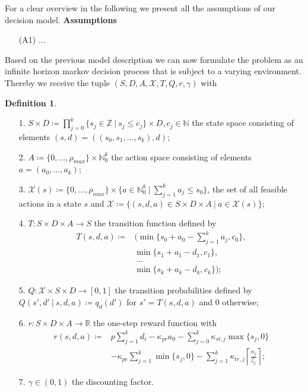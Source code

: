 \documentclass[journal, a4paper]{IEEEtran}
\theoremstyle{plain}
\theoremstyle{definition}
\newtheorem{defn}[thm]{Definition}
\begin{document}
%
For a clear overview in the following we present all the assumptions of our decision model.
\textbf{Assumptions}
\begin{itemize}
	\item[(A1)] ...
\end{itemize}
Based on the previous model description we can now formulate the problem as an infinite horizon markov decision process that is subject to a varying environment. Thereby we receive the tuple $(S, D, A, \mathcal{X}, T, Q, r, \gamma)$ with
\begin{defn} \label{def:modell} \
	\begin{itemize}
		\item[1.] $S \times D \coloneqq \prod\limits_{j=0}^{k} \{s_j \in \mathbb{Z} \ | \ s_j \leq c_j\} \times D, c_j \in \mathbb{N}$ the state space consisting of elements $(s,d) = ((s_0, s_1, ... , s_k), d)$;
		\item[2.] $ A \coloneqq  \{0, ..., \rho_{max} \} \times \mathbb{N}_0^k$ the action space consisting of elements $a = (a_0, ..., a_k)$;
		\item[3.] $ \mathcal{X} (s) \coloneqq \{0, ..., \rho_{max} \} \times \{a \in \mathbb{N}_0^k \ | \ \sum_{j=1}^{k}a_j \leq s_0  \}$, the set of all feasible actions in a state $s$ and $\mathcal{X} \coloneqq \{(s, d , a) \in S \times D \times A \ | \ a \in \mathcal{X} (s)\}$;
		\item[4.] $ T: S \times D \times A \rightarrow S$ the transition function defined by
			\begin{equation*}
				\begin{split}
					T(s, d, a) \coloneqq &(\min\{s_0 + a_0 - \sum_{j=1}^{k}a_j, c_0 \}, \\
					&\min\{s_1 + a_1 - d_1, c_1 \}, \\
					&\ ... \\
					&\min\{s_k + a_k - d_k, c_k \});
				\end{split}
			\end{equation*}
		\item[5.] $ Q: \mathcal{X} \times S \times D \rightarrow [0,1]  $ the transition probabilities defined by $Q(s', d'\ |\ s, d, a) \coloneqq q_d(d')$ for $s' = T(s, d, a)$ and $0$ otherwise;
		\item[6.] $ r: S \times D \times A \rightarrow \mathbb{R} $ the one-step reward function with 
			\begin{equation*}
				\begin{split}
					r(s, d, a) \coloneqq &p \sum_{j=1}^{k}d_i - \kappa_{pr} a_0 - \sum_{j=0}^{k} \kappa_{st, j} \max\{s_j, 0\} \\ 
					&-\kappa_{pe} \sum_{j=1}^{k}\min\{s_j, 0\} - \sum_{j=1}^{k} \kappa_{tr, j} \left\lceil \frac{a_j}{\zeta_j} \right\rceil;
				\end{split}
			\end{equation*}
		\item[7.] $\gamma \in (0, 1) $ the discounting factor.
	\end{itemize}
\end{defn}
\end{document}
